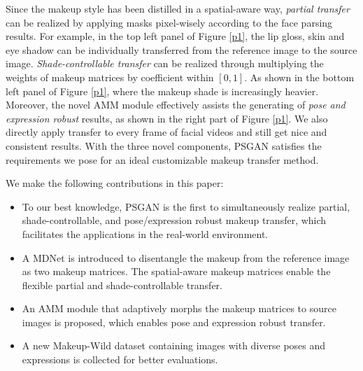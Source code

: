 Since the makeup style has been distilled in a spatial-aware way, \emph{partial transfer} can be realized by applying masks pixel-wisely according to the face parsing results.
For example, in the top left panel of Figure \ref{p1}, the lip gloss, skin and eye shadow can be individually transferred from the reference image to the source image.
\emph{Shade-controllable transfer} can be realized through multiplying the weights of makeup matrices by coefficient within $[0,1]$.
As shown in the bottom left panel of Figure \ref{p1}, where the makeup shade is increasingly heavier. 
Moreover, the novel AMM module effectively assists the generating of  \emph{pose and expression robust} results, as shown in the right part of  Figure \ref{p1}. We also directly apply transfer to every frame of facial videos and still get nice and consistent results.
With the three novel components, PSGAN satisfies the requirements we pose for an ideal customizable makeup transfer method. 

We make the following contributions in this paper:
\begin{itemize}
   \item To our best knowledge, PSGAN is the first to simultaneously realize partial, shade-controllable, and pose/expression robust makeup transfer, which facilitates the applications in the real-world environment.
   \item A MDNet is introduced to disentangle the makeup from the reference image as two makeup matrices. The spatial-aware makeup matrices enable the flexible partial and shade-controllable transfer.
   \item An AMM module that adaptively morphs the makeup matrices to source images is proposed, which enables pose and expression robust transfer.
   \item A new Makeup-Wild dataset containing images with diverse poses and expressions is collected for better evaluations.
\end{itemize}

